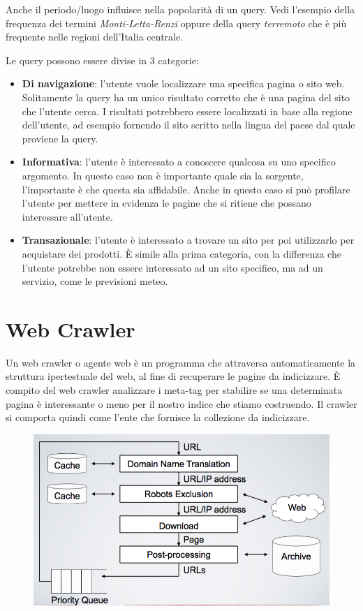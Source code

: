 Anche il periodo/luogo influisce nella popolarità di un query. Vedi l'esempio della frequenza dei termini \textit{Monti-Letta-Renzi} oppure della query \textit{terremoto} che è più frequente nelle regioni dell'Italia centrale.

Le query possono essere divise in 3 categorie:

\begin{itemize}
	\item \textbf{Di navigazione}: l'utente vuole localizzare una specifica pagina o sito web. Solitamente la query ha un unico risultato corretto che è una pagina del sito che l'utente cerca. I risultati potrebbero essere localizzati in base alla regione dell'utente, ad esempio fornendo il sito scritto nella lingua del paese dal quale proviene la query.
	\item \textbf{Informativa}: l'utente è interessato a conoscere qualcosa su uno specifico argomento. In questo caso non è importante quale sia la sorgente, l'importante è che questa sia affidabile. Anche in questo caso si può profilare l'utente per mettere in evidenza le pagine che si ritiene che possano interessare all'utente.
	\item \textbf{Transazionale}: l'utente è interessato a trovare un sito per poi utilizzarlo per acquistare dei prodotti. \`E simile alla prima categoria, con la differenza che l'utente potrebbe non essere interessato ad un sito specifico, ma ad un servizio, come le previsioni meteo.
\end{itemize}

\section{Web Crawler}

Un web crawler o agente web è un programma che attraversa automaticamente la struttura ipertestuale del web, al fine di recuperare le pagine da indicizzare.
\`E compito del web crawler analizzare i meta-tag per stabilire se una determinata pagina è interessante o meno per il nostro indice che stiamo costruendo. Il crawler si comporta quindi come l'ente che fornisce la collezione da indicizzare.

\begin{figure}[htbp]
	\centering
	\includegraphics[width=.6\textwidth]{images/l18-fig-2.png}
\end{figure}


